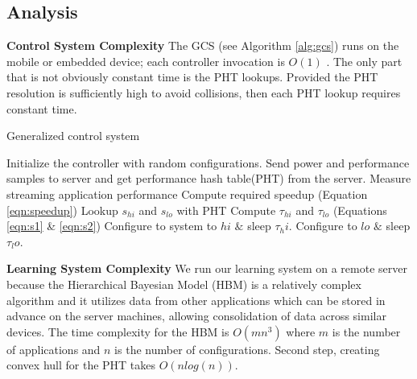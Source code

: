 

\subsection{Analysis}

\noindent \textbf{Control System Complexity} The GCS (see Algorithm
\ref{alg:gcs}) runs on the mobile or embedded device; each controller
invocation is $O(1)$ .  The only part that is not obviously constant
time is the PHT lookups.  Provided the PHT resolution is sufficiently
high to avoid collisions, then each PHT lookup requires constant time.
\begin{algorithm}[t]
\caption{Generalized control system}
\label{alg:gcs}
\begin{algorithmic}
\REQUIRE Initialize the controller with random configurations. Send power and performance samples to server and get performance hash table(PHT) from the server.
    \STATE    Measure streaming application performance 
    \STATE    Compute required speedup (Equation \eqref{eqn:speedup})
    \STATE    Lookup $s_{hi}$ and $s_{lo}$ with PHT
    \STATE    Compute $\tau_{hi}$ and $\tau_{lo}$ (Equations \ref{eqn:s1} \& \ref{eqn:s2})
    \STATE    Configure to system to $hi$ $\&$ sleep $\tau_hi$.
    \STATE    Configure to $lo$ $\&$ sleep $\tau_lo$.
\ENDWHILE
\end{algorithmic}
\end{algorithm}


\noindent \textbf{Learning System Complexity} We run our learning
system on a remote server because the Hierarchical Bayesian Model
(HBM) is a relatively complex algorithm and it utilizes data from
other applications which can be stored in advance on the server
machines, allowing consolidation of data across similar devices.  The
time complexity for the HBM is $O(mn^3)$ where $m$ is the number of
applications and $n$ is the number of configurations.  Second step,
creating convex hull for the PHT takes $O(n log(n))$.

